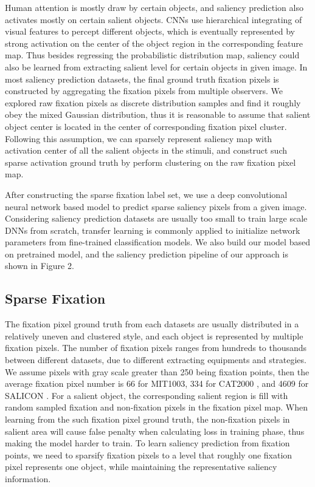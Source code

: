\documentclass[letterpaper, 10 pt, conference]{ieeeconf}  %
\begin{document}
\par Human attention is mostly draw by certain objects, and saliency prediction also activates mostly on certain salient objects. CNNs use hierarchical integrating of visual features to percept different objects, which is eventually represented by strong activation on the center of the object region in the corresponding feature map. Thus besides regressing the probabilistic distribution map, saliency could also be learned from extracting salient level for certain objects in given image. In most saliency prediction datasets, the final ground truth fixation pixels is constructed by aggregating the fixation pixels from multiple observers. We explored raw fixation pixels as discrete distribution samples and find it roughly obey the mixed Gaussian distribution, thus it is reasonable to assume that salient object center is located in the center of corresponding fixation pixel cluster. Following this assumption, we can sparsely represent saliency map with activation center of all the salient objects in the stimuli, and construct such sparse activation ground truth by perform clustering on the raw fixation pixel map.

\par After constructing the sparse fixation label set, we use a deep convolutional neural network based model to predict sparse saliency pixels from a given image. Considering saliency prediction datasets are usually too small to train large scale DNNs from scratch, transfer learning is commonly applied to initialize network parameters from fine-trained classification models. We also build our model based on pretrained model, and the saliency prediction pipeline of our approach is shown in Figure 2.

\subsection{Sparse Fixation}

\par The fixation pixel ground truth from each datasets are usually distributed in a relatively uneven and clustered style, and each object is represented by multiple fixation pixels. The number of fixation pixels ranges from hundreds to thousands between different datasets, due to different extracting equipments and strategies. We assume pixels with gray scale greater than 250 being fixation points, then the average fixation pixel number is 66 for MIT1003\cite{b23}, 334 for CAT2000 \cite{b24}, and 4609 for SALICON \cite{b25}. For a salient object, the corresponding salient region is fill with random sampled fixation and non-fixation pixels in the fixation pixel map. When learning from the such fixation pixel ground truth, the non-fixation pixels in salient area will cause false penalty when calculating loss in training phase, thus making the model harder to train. To learn saliency prediction from fixation points, we need to sparsify fixation pixels to a level that roughly one fixation pixel represents one object, while maintaining the representative saliency information.
\end{document}
